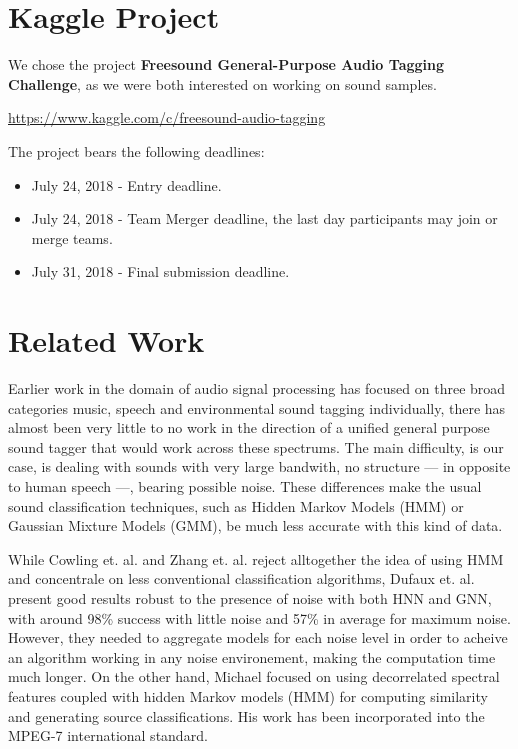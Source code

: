 \documentclass{article} %
\begin{document}
\section{Kaggle Project}

	We chose the project \textbf{Freesound General-Purpose Audio Tagging Challenge}, as we were both interested on working on sound samples.
	\begin{center}
	   \url{https://www.kaggle.com/c/freesound-audio-tagging}
	\end{center}
	The project bears the following deadlines:
	\begin{itemize}
	    \item July 24, 2018 - Entry deadline.
	    \item July 24, 2018 - Team Merger deadline, the last day participants may join or merge teams.
	    \item July 31, 2018 - Final submission deadline.
	\end{itemize}
    

\section{Related Work}
    Earlier work in the domain of audio signal processing has focused on three broad categories music, speech and environmental sound tagging individually, there has almost been very little to no work in the direction of a unified general purpose sound tagger that would work across these spectrums.
    The main difficulty, is our case, is dealing with sounds with very large bandwith, no structure --- in opposite to human speech ---, bearing possible noise. These differences make the usual sound classification techniques, such as Hidden Markov Models (HMM) or Gaussian Mixture Models (GMM), be much less accurate with this kind of data.

    While Cowling et. al. \cite{cite1} and Zhang et. al. \cite{cite2} reject alltogether the idea of using HMM and concentrale on less conventional classification algorithms, Dufaux et. al. \cite{cite3} present good results robust to the presence of noise with both HNN and GNN, with around 98\% success with little noise and 57\% in average for maximum noise. However, they needed to aggregate models for each noise level in order to acheive an algorithm working in any noise environement, making the computation time much longer. On the other hand, Michael \cite{cite4} focused on using decorrelated spectral features coupled with hidden Markov models (HMM) for computing similarity and generating source classifications. His work has been incorporated into the MPEG-7 international standard. 
\end{document}
